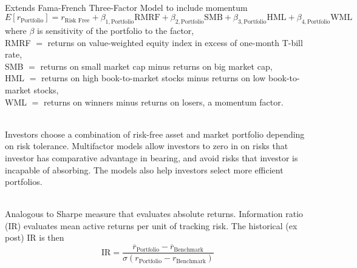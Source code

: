 \begin{definition} \\
Extends Fama-French Three-Factor Model to include momentum
\begin{equation}
E[r_{\text{Portfolio}}] = r_{\text{Risk Free}} + \beta_{1, \text{Portfolio}} \text{RMRF} + \beta_{2, \text{Portfolio}} \text{SMB} + \beta_{3, \text{Portfolio}} \text{HML} + \beta_{4, \text{Portfolio}} \text{WML} \nonumber
\end{equation}
where $\beta$ is sensitivity of the portfolio to the factor,\\
RMRF $=$ returns on value-weighted equity index in excess of one-month T-bill rate,\\
SMB $=$ returns on small market cap minus returns on big market cap,\\
HML $=$ returns on high book-to-market stocks minus returns on low book-to-market stocks,\\
WML $=$ returns on winners minus returns on losers, a momentum factor.
\end{definition}

\begin{remark} \\
Investors choose a combination of risk-free asset and market portfolio depending on risk tolerance. Multifactor models allow investors to zero in on risks that investor has comparative advantage in bearing, and avoid risks that investor is incapable of absorbing. The models also help investors select more efficient portfolios.
\end{remark}

\begin{definition} \\
Analogous to Sharpe measure that evaluates absolute returns. Information ratio (IR) evaluates mean active returns per unit of tracking risk. The historical (ex post) IR is then
\begin{equation}
\text{IR} = \frac{\overline{r}_{\text{Portfolio}} - \overline{r}_{\text{Benchmark}}}{\sigma(r_{\text{Portfolio}} - r_{\text{Benchmark}})} \nonumber
\end{equation}
\end{definition}